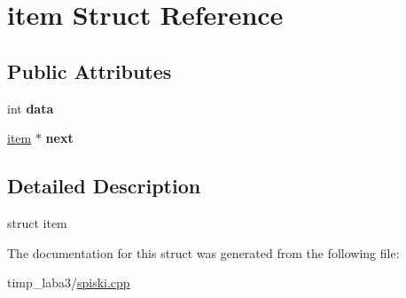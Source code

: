 \hypertarget{structitem}{}\section{item Struct Reference}
\label{structitem}
\subsection*{Public Attributes}
\begin{DoxyCompactItemize}
\item 
\hypertarget{structitem_a9b8da1a60b226244d97be5f1aa25c660}{}int {\bfseries data}\label{structitem_a9b8da1a60b226244d97be5f1aa25c660}

\item 
\hypertarget{structitem_a55e5cfe61dec8b342015a50a3972df7d}{}\hyperlink{structitem}{item} $\ast$ {\bfseries next}\label{structitem_a55e5cfe61dec8b342015a50a3972df7d}

\end{DoxyCompactItemize}


\subsection{Detailed Description}
struct item 

The documentation for this struct was generated from the following file\+:\begin{DoxyCompactItemize}
\item 
timp\+\_\+laba3/\hyperlink{spiski_8cpp}{spiski.\+cpp}\end{DoxyCompactItemize}
